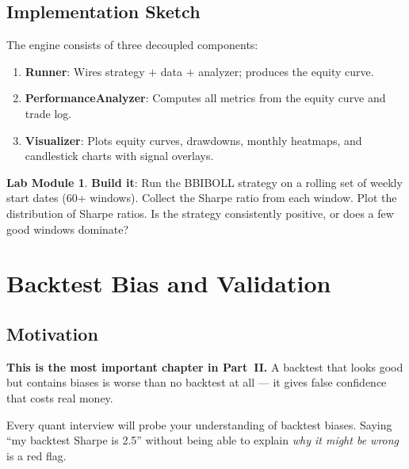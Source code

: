 \documentclass[a4paper, 11pt]{report}
\theoremstyle{definition}
\newtheorem{labmod}{Lab Module}[chapter]
\theoremstyle{remark}
\begin{document}
\section{Implementation Sketch}

The engine consists of three decoupled components:

\begin{enumerate}
    \item \textbf{Runner}: Wires strategy $+$ data $+$ analyzer; produces the
          equity curve.
    \item \textbf{PerformanceAnalyzer}: Computes all metrics from the equity
          curve and trade log.
    \item \textbf{Visualizer}: Plots equity curves, drawdowns, monthly
          heatmaps, and candlestick charts with signal overlays.
\end{enumerate}

\begin{labmod}
    \textbf{Build it}: Run the BBIBOLL strategy on a rolling set of weekly
    start dates (60+ windows).  Collect the Sharpe ratio from each window.
    Plot the distribution of Sharpe ratios.  Is the strategy consistently
    positive, or does a few good windows dominate?
\end{labmod}


\chapter{Backtest Bias and Validation}
\label{ch:bias}

\section{Motivation}

\textbf{This is the most important chapter in Part~II.}  A backtest that looks
good but contains biases is worse than no backtest at all --- it gives false
confidence that costs real money.

Every quant interview will probe your understanding of backtest biases.  Saying
``my backtest Sharpe is 2.5'' without being able to explain \emph{why it might be
wrong} is a red flag.

\end{document}
